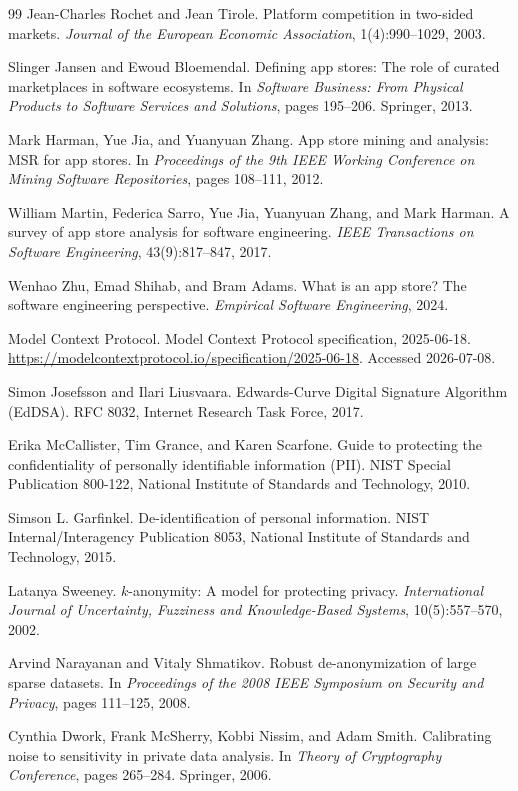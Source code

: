\documentclass[10pt,twocolumn]{article}
\begin{document}
\begin{thebibliography}{99}
Jean-Charles Rochet and Jean Tirole.
\newblock Platform competition in two-sided markets.
\newblock \emph{Journal of the European Economic Association}, 1(4):990--1029, 2003.

Slinger Jansen and Ewoud Bloemendal.
\newblock Defining app stores: The role of curated marketplaces in software ecosystems.
\newblock In \emph{Software Business: From Physical Products to Software Services and Solutions}, pages 195--206. Springer, 2013.

Mark Harman, Yue Jia, and Yuanyuan Zhang.
\newblock App store mining and analysis: MSR for app stores.
\newblock In \emph{Proceedings of the 9th IEEE Working Conference on Mining Software Repositories}, pages 108--111, 2012.

William Martin, Federica Sarro, Yue Jia, Yuanyuan Zhang, and Mark Harman.
\newblock A survey of app store analysis for software engineering.
\newblock \emph{IEEE Transactions on Software Engineering}, 43(9):817--847, 2017.

Wenhao Zhu, Emad Shihab, and Bram Adams.
\newblock What is an app store? The software engineering perspective.
\newblock \emph{Empirical Software Engineering}, 2024.

Model Context Protocol.
\newblock Model Context Protocol specification, 2025-06-18.
\newblock \url{https://modelcontextprotocol.io/specification/2025-06-18}.
\newblock Accessed 2026-07-08.

Simon Josefsson and Ilari Liusvaara.
\newblock Edwards-Curve Digital Signature Algorithm (EdDSA).
\newblock RFC 8032, Internet Research Task Force, 2017.

Erika McCallister, Tim Grance, and Karen Scarfone.
\newblock Guide to protecting the confidentiality of personally identifiable information (PII).
\newblock NIST Special Publication 800-122, National Institute of Standards and Technology, 2010.

Simson L. Garfinkel.
\newblock De-identification of personal information.
\newblock NIST Internal/Interagency Publication 8053, National Institute of Standards and Technology, 2015.

Latanya Sweeney.
\newblock $k$-anonymity: A model for protecting privacy.
\newblock \emph{International Journal of Uncertainty, Fuzziness and Knowledge-Based Systems}, 10(5):557--570, 2002.

Arvind Narayanan and Vitaly Shmatikov.
\newblock Robust de-anonymization of large sparse datasets.
\newblock In \emph{Proceedings of the 2008 IEEE Symposium on Security and Privacy}, pages 111--125, 2008.

Cynthia Dwork, Frank McSherry, Kobbi Nissim, and Adam Smith.
\newblock Calibrating noise to sensitivity in private data analysis.
\newblock In \emph{Theory of Cryptography Conference}, pages 265--284. Springer, 2006.

\end{thebibliography}
\end{document}
